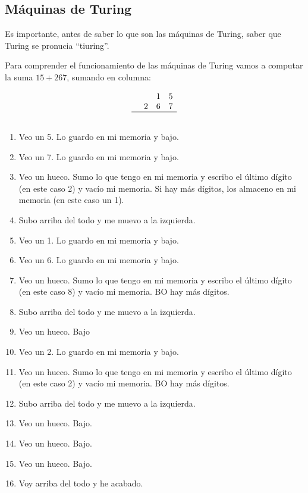 
\subsection{Máquinas de Turing}

Es importante, antes de saber lo que son las máquinas de Turing, saber que Turing se pronucia ``tiuring''.

\begin{example}
Para comprender el funcionamiento de las máquinas de Turing vamos a computar la suma $15 + 267$, sumando en columna:

\[
\begin{array}{cccc}
&&1&5\\
&2&6&7\\\hline
&&&
\end{array}
\]

\begin{enumerate}
	\item Veo un 5. Lo guardo en mi memoria y bajo.
	\item Veo un 7. Lo guardo en mi memoria y bajo.
	\item Veo un hueco. Sumo lo que tengo en mi memoria y escribo el último dígito (en este caso 2) y vacío mi memoria. Si hay más dígitos, los almaceno en mi memoria (en este caso un 1).
	\item Subo arriba del todo y me muevo a la izquierda.
	\item Veo un 1. Lo guardo en mi memoria y bajo.
	\item Veo un 6. Lo guardo en mi memoria y bajo.
	\item Veo un hueco. Sumo lo que tengo en mi memoria y escribo el último dígito (en este caso 8) y vacío mi memoria. BO hay más dígitos.
	\item Subo arriba del todo y me muevo a la izquierda.
	\item Veo un hueco. Bajo
	\item Veo un 2. Lo guardo en mi memoria y bajo.
	\item Veo un hueco. Sumo lo que tengo en mi memoria y escribo el último dígito (en este caso 2) y vacío mi memoria. BO hay más dígitos.
	\item Subo arriba del todo y me muevo a la izquierda.
	\item Veo un hueco. Bajo.
	\item Veo un hueco. Bajo.
	\item Veo un hueco. Bajo.
	\item Voy arriba del todo y he acabado.
\end{enumerate}
\end{example}


